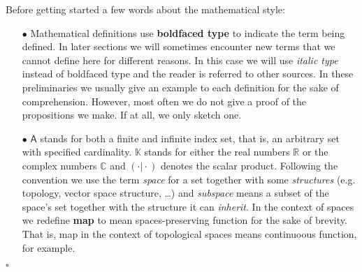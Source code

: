 \begin{rem}
\label{rem:style}
Before getting started a few words about the mathematical style: 
\begin{enumerate}
\item[$\bullet$]
  Mathematical definitions use \textbf{boldfaced type} to indicate the term being defined. In later sections we will sometimes encounter new terms that we cannot define here for different reasons. In this case we will use \textit{italic type} instead of boldfaced type and the reader is referred to other sources. In these preliminaries we usually give an example to each definition for the sake of comprehension. However, most often we do not give a proof of the propositions we make. If at all, we only sketch one. 
\item[$\bullet$]
  $\mathsf{A}$ stands for both a finite and infinite index set, that is, an arbitrary set with specified cardinality. $\mathbb{K}$ stands for either the real numbers $\mathbb{R}$ or the complex numbers $\mathbb{C}$ and $(\cdot \vert \cdot)$ denotes the scalar product. Following the convention we use the term \textit{space} for a set together with some \textit{structures} (e.g. topology, vector space structure, \ldots) and \textit{subspace} means a subset of the space's set together with the structure it can \textit{inherit}. In the context of spaces we redefine \textbf{map} to mean spaces-preserving function for the sake of brevity. That is, map in the context of topological spaces means continuoous function, for example.
\end{enumerate}
\phantom{proven}
\hfill
$\square$
\end{rem}
